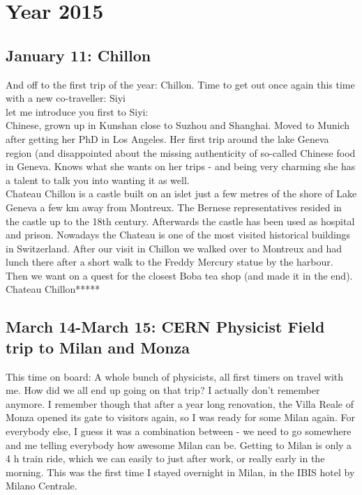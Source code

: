 \chapter{Year 2015}
\label{2015}

\section{January 11: Chillon}
\label{2015:Chillon}

And off to the first trip of the year: Chillon. Time to get out once again this time with a new co-traveller: Siyi\\

let me introduce you first to Siyi:\\
Chinese, grown up in Kunshan close to Suzhou and Shanghai. Moved to Munich after getting her PhD in Los Angeles. Her first trip around the lake Geneva region (and disappointed about the missing authenticity of so-called Chinese food in Geneva. Knows what she wants on her trips - and being very charming she has a talent to talk you into wanting it as well.\\

Chateau Chillon is a castle built on an islet just a few metres of the shore of Lake Geneva a few km away from Montreux. The Bernese representatives resided in the castle up to the 18th century. Afterwards the castle has been used as hospital and prison. Nowadays the Chateau is one of the most visited historical buildings in Switzerland. After our visit in Chillon we walked over to Montreux and had lunch there after a short walk to the Freddy Mercury statue by the harbour. Then we want on a quest for the closest Boba tea shop (and made it in the end).\\

Chateau Chillon*****

\section{March 14-March 15: CERN Physicist Field trip to Milan and Monza}
\label{2015:Milan}

This time on board: A whole bunch of physicists, all first timers on travel with me. How did we all end up going on that trip? I actually don't remember anymore. I remember though that after a year long renovation, the Villa Reale of Monza opened its gate to visitors again, so I was ready for some Milan again. For everybody else,  I guess it was a combination between - we need to go somewhere and me telling everybody how awesome Milan can be. Getting to Milan is only a 4 h train ride, which we can easily to just after work, or really early in the morning. This was the first time I stayed overnight in Milan, in the IBIS hotel by Milano Centrale.\\


